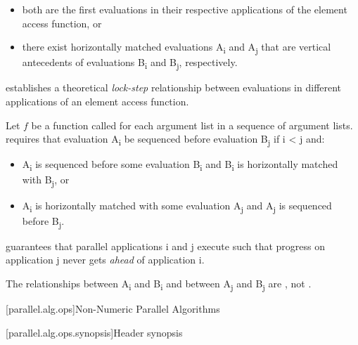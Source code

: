 \begin{itemize}
\item both are the first evaluations in their respective applications of the element access function, or
\item there exist horizontally matched evaluations A\textsubscript{i} and A\textsubscript{j} that are vertical antecedents of evaluations B\textsubscript{i} and B\textsubscript{j}, respectively.
\end{itemize}

\begin{note} establishes a theoretical {\em lock-step} relationship between evaluations in different applications of an element access function.\end{note}

\pnum
Let $f$ be a function called for each argument list in a sequence of argument lists.  requires that evaluation A\textsubscript{i} be sequenced before evaluation B\textsubscript{j} if i < j and:

\begin{itemize}
\item A\textsubscript{i} is sequenced before some evaluation B\textsubscript{i} and B\textsubscript{i} is horizontally matched with B\textsubscript{j}, or
\item A\textsubscript{i} is horizontally matched with some evaluation A\textsubscript{j} and A\textsubscript{j} is sequenced before B\textsubscript{j}.
\end{itemize}

\begin{note}
 guarantees that parallel applications i and j execute such that progress on application j never gets {\em ahead} of application i.
\end{note}
\begin{note}
The relationships between A\textsubscript{i} and B\textsubscript{i} and between A\textsubscript{j} and B\textsubscript{j} are , not .
\end{note}

[parallel.alg.ops]{Non-Numeric Parallel Algorithms}

[parallel.alg.ops.synopsis]{Header  synopsis}

